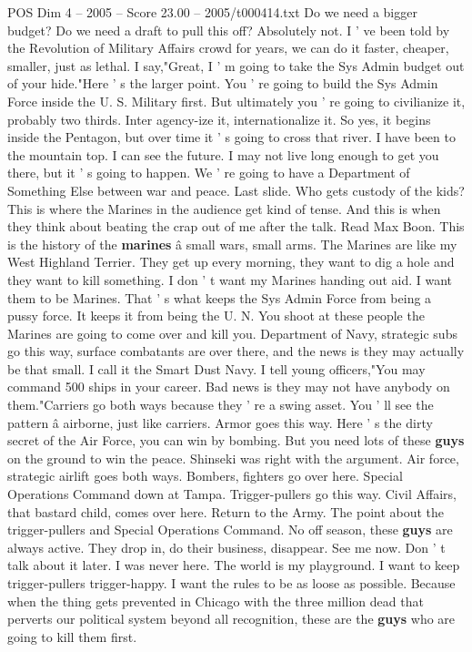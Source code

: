 \begin{textsample}{POS Dim 4 – 2005 – Score 23.00 – 2005/t000414.txt}
Do we need a bigger budget?
Do we need a draft to pull this off?
Absolutely not.
I ' ve been told by the Revolution of Military Affairs crowd for years, we can do it faster, cheaper, smaller, just as lethal.
I say,"Great, I ' m going to take the Sys Admin budget out of your hide."Here ' s the larger point.
You ' re going to build the Sys Admin Force inside the U.
S.
Military first.
But ultimately you ' re going to civilianize it, probably two thirds.
Inter agency-ize it, internationalize it.
So yes, it begins inside the Pentagon, but over time it ' s going to cross that river.
I have been to the mountain top.
I can see the future.
I may not live long enough to get you there, but it ' s going to happen.
We ' re going to have a Department of Something Else between war and peace.
Last slide.
Who gets custody of the kids?
This is where the Marines in the audience get kind of tense.
And this is when they think about beating the crap out of me after the talk.
Read Max Boon.
This is the history of the \textbf{marines} â small wars, small arms.
The Marines are like my West Highland Terrier.
They get up every morning, they want to dig a hole and they want to kill something.
I don ' t want my Marines handing out aid.
I want them to be Marines.
That ' s what keeps the Sys Admin Force from being a pussy force.
It keeps it from being the U.
N.
You shoot at these people the Marines are going to come over and kill you.
Department of Navy, strategic subs go this way, surface combatants are over there, and the news is they may actually be that small.
I call it the Smart Dust Navy.
I tell young officers,"You may command 500 ships in your career.
Bad news is they may not have anybody on them."Carriers go both ways because they ' re a swing asset.
You ' ll see the pattern â airborne, just like carriers.
Armor goes this way.
Here ' s the dirty secret of the Air Force, you can win by bombing.
But you need lots of these \textbf{guys} on the ground to win the peace.
Shinseki was right with the argument.
Air force, strategic airlift goes both ways.
Bombers, fighters go over here.
Special Operations Command down at Tampa.
Trigger-pullers go this way.
Civil Affairs, that bastard child, comes over here.
Return to the Army.
The point about the trigger-pullers and Special Operations Command.
No off season, these \textbf{guys} are always active.
They drop in, do their business, disappear.
See me now.
Don ' t talk about it later.
I was never here.
The world is my playground.
I want to keep trigger-pullers trigger-happy.
I want the rules to be as loose as possible.
Because when the thing gets prevented in Chicago with the three million dead that perverts our political system beyond all recognition, these are the \textbf{guys} who are going to kill them first.

\end{textsample}
